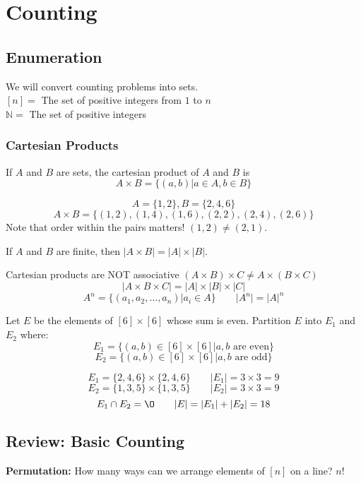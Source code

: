 \documentclass{article}
\begin{document}
\tpage

\section{Counting}
\label{sec:counting}


\subsection{Enumeration}
We will convert counting problems into sets. \\
$[n] = $ The set of positive integers from $1$ to $n$ \\
$\mathbb{N} = $ The set of positive integers

\subsubsection{Cartesian Products}
If $A$ and $B$ are sets, the cartesian product of $A$ and $B$ is $$A \times B = \{(a,b) | a \in A, b \in B\}$$

\example $$A = \{1,2\},  B = \{2,4,6\}$$
$$A \times B = \{(1,2), (1,4), (1,6), (2,2), (2,4), (2,6) \}$$
Note that order within the pairs matters! $(1,2) \neq (2,1)$.


If $A$ and $B$ are finite, then $|A \times B | = | A | \times | B |$.

Cartesian products are NOT associative $(A \times B) \times C \neq A \times (B \times C)$
$$|A \times B \times C | = |A| \times |B| \times |C|$$
$$A^n = \{(a_1,a_2,\dots , a_n) | a_i \in A\} \qquad |A^n| = |A|^n$$

\example Let $E$ be the elements of $[6] \times [6]$ whose sum is even. Partition $E$ into $E_1$ and $E_2$ where:
$$E_1 = \{(a,b) \in [6] \times [6] | a,b \text{ are even}\}$$
$$E_2 = \{(a,b) \in [6] \times [6] | a,b \text{ are odd}\}$$

$$E_1 = \{2,4,6\} \times \{2,4,6\} \qquad |E_1| = 3 \times 3 = 9$$
$$E_2 = \{1,3,5\} \times \{1,3,5\} \qquad |E_2| = 3 \times 3 = 9$$
$$E_1 \cap E_2 = \O \qquad |E|=|E_1|+|E_2| = 18$$

\subsection{Review: Basic Counting}


\begin{defn}
	\textbf{Permutation:}
	How many ways can we arrange elements of $[n]$ on a line? $n!$
\end{defn}
\end{document}
